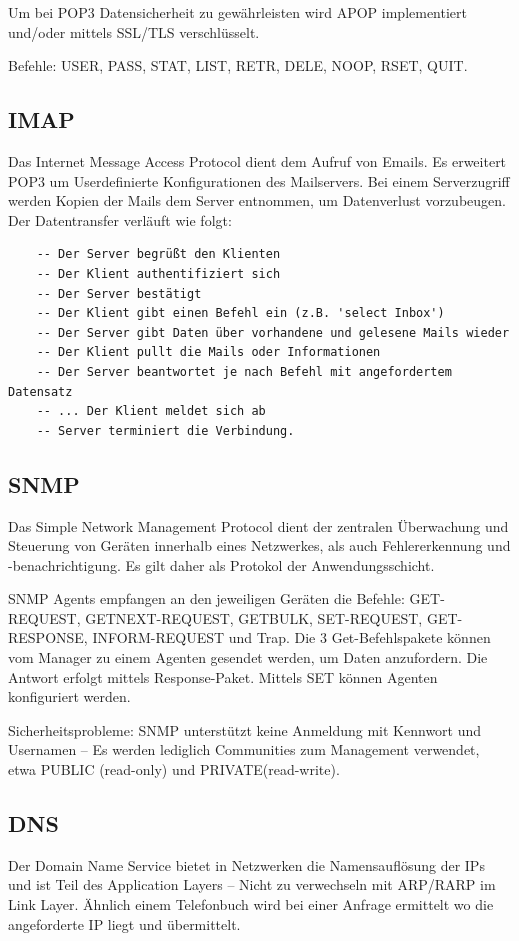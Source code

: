 \documentclass{article}
\begin{document}
    Um bei POP3 Datensicherheit zu gewährleisten wird APOP implementiert und/oder mittels SSL/TLS verschlüsselt. 

    Befehle: USER, PASS, STAT, LIST, RETR, DELE, NOOP, RSET, QUIT.

    \subsection{IMAP}
    Das Internet Message Access Protocol dient dem Aufruf von Emails. Es erweitert POP3 um Userdefinierte Konfigurationen des Mailservers. Bei einem Serverzugriff werden Kopien der Mails dem Server entnommen, um Datenverlust vorzubeugen.
    Der Datentransfer verläuft wie folgt:
    \begin{verbatim}
    -- Der Server begrüßt den Klienten
    -- Der Klient authentifiziert sich
    -- Der Server bestätigt
    -- Der Klient gibt einen Befehl ein (z.B. 'select Inbox')
    -- Der Server gibt Daten über vorhandene und gelesene Mails wieder
    -- Der Klient pullt die Mails oder Informationen
    -- Der Server beantwortet je nach Befehl mit angefordertem Datensatz
    -- ... Der Klient meldet sich ab
    -- Server terminiert die Verbindung.
    \end{verbatim}
    
    \subsection{SNMP}
    Das Simple Network Management Protocol dient der zentralen Überwachung und Steuerung von Geräten innerhalb eines Netzwerkes, als auch Fehlererkennung und -benachrichtigung. Es gilt daher als Protokol der Anwendungsschicht.
    
    SNMP Agents empfangen an den jeweiligen Geräten die Befehle: GET-REQUEST, GETNEXT-REQUEST, GETBULK, SET-REQUEST, GET-RESPONSE, INFORM-REQUEST und Trap.
    Die 3 Get-Befehlspakete können vom Manager zu einem Agenten gesendet werden, um Daten anzufordern. Die Antwort erfolgt mittels Response-Paket.
    Mittels SET können Agenten konfiguriert werden.
    
    Sicherheitsprobleme: SNMP unterstützt keine Anmeldung mit Kennwort und Usernamen -- Es werden lediglich Communities zum Management verwendet, etwa PUBLIC (read-only) und PRIVATE(read-write).
    
    \subsection{DNS}
    Der Domain Name Service bietet in Netzwerken die Namensauflösung der IPs und ist Teil des Application Layers -- Nicht zu verwechseln mit ARP/RARP im Link Layer.
    Ähnlich einem Telefonbuch wird bei einer Anfrage ermittelt wo die angeforderte IP liegt und übermittelt.
\end{document}
